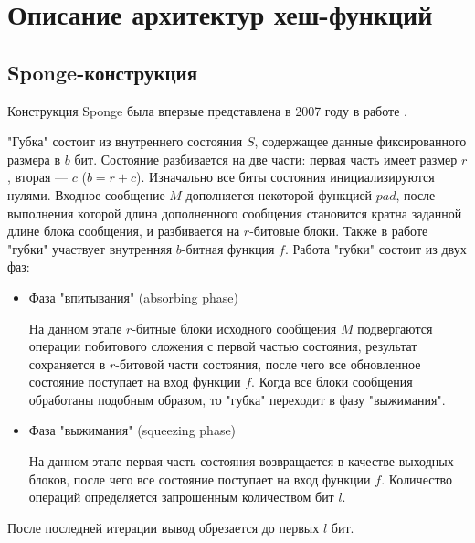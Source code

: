 \documentclass{./civarticle}
\begin{document}
\section{Описание архитектур хеш-функций}

\subsection{Sponge-конструкция}

Конструкция Sponge была впервые представлена в 2007 году в работе \cite{sponge}. 

"Губка" состоит из внутреннего состояния $S$, содержащее данные фиксированного размера в $b$ бит. Состояние разбивается на две части: первая часть имеет размер $r$, вторая --- $c$ ($b = r + c$). Изначально все биты состояния инициализируются нулями. Входное сообщение $M$ дополняется некоторой функцией $pad$, после выполнения которой длина дополненного сообщения становится кратна заданной длине блока сообщения, и разбивается на $r$-битовые блоки. Также в работе "губки" участвует внутренняя $b$-битная функция $f$. Работа "губки" состоит из двух фаз:

\begin{itemize}
    \item Фаза "впитывания" (absorbing phase)

    На данном этапе $r$-битные блоки исходного сообщения $M$ подвергаются операции побитового сложения с первой частью состояния, результат сохраняется в $r$-битовой части состояния, после чего все обновленное состояние поступает на вход функции $f$. Когда все блоки сообщения обработаны подобным образом, то "губка" переходит в фазу "выжимания".

    \item Фаза "выжимания" (squeezing phase)

    На данном этапе первая часть состояния возвращается в качестве выходных блоков, после чего все состояние поступает на вход функции $f$. Количество операций определяется запрошенным количеством бит $l$.
    
\end{itemize}

После последней итерации вывод обрезается до первых $l$ бит.

\begin{figure}[h!]
        \end{figure}
\end{document}
